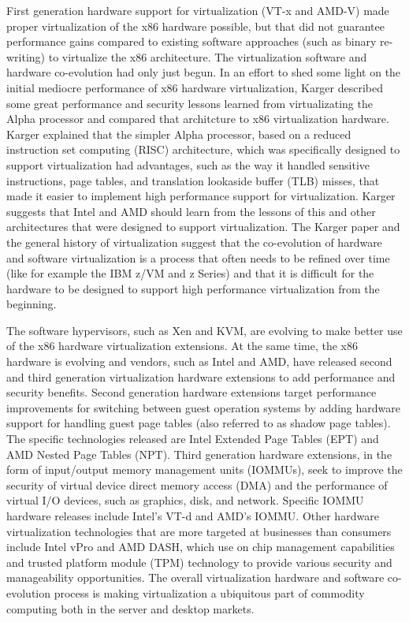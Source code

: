 First generation hardware support for virtualization (VT-x and AMD-V) made proper virtualization\cite{popek_1974} of the x86 hardware possible, but that did not guarantee performance gains compared to existing software approaches (such as binary re-writing) to virtualize the x86 architecture\cite{adams_2006}. The virtualization software and hardware co-evolution had only just begun. In an effort to shed some light on the initial mediocre performance of x86 hardware virtualization, Karger described some great performance and security lessons learned from virtualizating the Alpha processor and compared that architcture to x86 virtualization hardware\cite{karger_2007}. Karger explained that the simpler Alpha processor, based on a reduced instruction set computing (RISC) architecture, which was specifically designed to support virtualization had advantages, such as the way it handled sensitive instructions, page tables, and translation lookaside buffer (TLB) misses, that made it easier to implement high performance support for virtualization. Karger suggests that Intel and AMD should learn from the lessons of this and other architectures that were designed to support virtualization. The Karger paper and the general history of virtualization suggest that the co-evolution of hardware and software virtualization is a process that often needs to be refined over time (like for example the IBM z/VM and z Series) and that it is difficult for the hardware to be designed to support high performance virtualization from the beginning.

The software hypervisors, such as Xen and KVM, are evolving to make better use of the x86 hardware virtualization extensions. At the same time, the x86 hardware is evolving and vendors, such as Intel and AMD, have released second and third generation virtualization hardware extensions to add performance and security benefits. Second generation hardware extensions target performance improvements for switching between guest operation systems by adding hardware support for handling guest page tables (also referred to as shadow page tables). The specific technologies released are Intel Extended Page Tables (EPT) and AMD Nested Page Tables (NPT). Third generation hardware extensions, in the form of input/output memory management units (IOMMUs), seek to improve the security of virtual device direct memory access (DMA) and the performance of virtual I/O devices, such as graphics, disk, and network. Specific IOMMU hardware releases include Intel's VT-d and AMD's IOMMU. Other hardware virtualization technologies that are more targeted at businesses than consumers include Intel vPro and AMD DASH, which use on chip management capabilities and trusted platform module (TPM) technology to provide various security and manageability opportunities. The overall virtualization hardware and software co-evolution process is making virtualization a ubiquitous part of commodity computing both in the server and desktop markets. 

